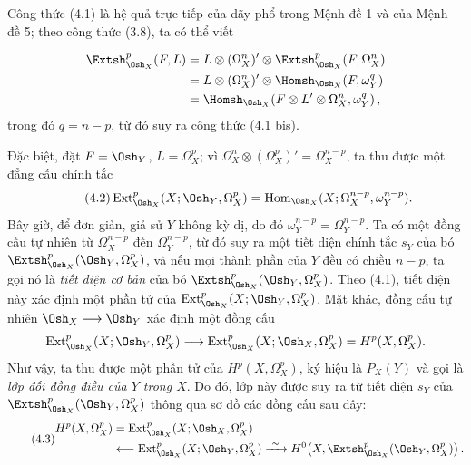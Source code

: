Công thức (4.1) là hệ quả trực tiếp của dãy phổ trong
Mệnh đề 1 và của Mệnh đề 5; theo công thức (3.8), ta có thể
viết


\begin{align*}
\Extsh_{\Osh_X}^{p}(F,L)
&=L\otimes(\Omega_X^{n})'\otimes
  \Extsh_{\Osh_X}^{p}(F,\Omega_X^{n})\\
&=L\otimes(\Omega_X^{n})'\otimes
  \Homsh_{\Osh_X}(F,\omega_Y^{q})\\
&=\Homsh_{\Osh_X}\!\left(
  F\otimes L'\otimes\Omega_X^{n},\omega_Y^{q}\right),
\end{align*}
trong đó $q=n-p$, từ đó suy ra công thức (4.1 bis).

Đặc biệt, đặt $F=\Osh_Y$, $L=\Omega_X^{p}$; vì
$\Omega_X^{n}\otimes(\Omega_X^{p})'=\Omega_X^{n-p}$, ta thu được một đẳng cấu
chính tắc
\begin{equation}\tag{4.2}
  \operatorname{Ext}_{\Osh_X}^{p}(X;\Osh_Y,\Omega_X^{p})
  =\operatorname{Hom}_{\Osh_X}
  (X;\Omega_X^{n-p},\omega_Y^{n-p}).
\end{equation}
Bây giờ, để đơn giản, giả sử $Y$ không kỳ dị, do đó
$\omega_Y^{n-p}=\Omega_Y^{n-p}$. Ta có một đồng cấu tự nhiên từ
$\Omega_X^{n-p}$ đến $\Omega_Y^{n-p}$, từ đó suy ra một tiết diện chính tắc $s_Y$ của
bó $\Extsh_{\Osh_X}^{p}(\Osh_Y,\Omega_X^{p})$, và nếu
mọi thành phần của $Y$ đều có chiều $n-p$, ta gọi nó là \emph{tiết diện
cơ bản} của bó $\Extsh_{\Osh_X}^{p}(\Osh_Y,\Omega_X^{p})$. Theo (4.1), tiết diện
này xác định một phần tử của
$\operatorname{Ext}_{\Osh_X}^{p}(X;\Osh_Y,\Omega_X^{p})$. Mặt khác, đồng cấu
tự nhiên $\Osh_X\longrightarrow\Osh_Y$ xác định một đồng cấu
\[
  \operatorname{Ext}_{\Osh_X}^{p}(X;\Osh_Y,\Omega_X^{p})
  \longrightarrow
  \operatorname{Ext}_{\Osh_X}^{p}(X;\Osh_X,\Omega_X^{p})
  =H^{p}(X,\Omega_X^{p}).
\]
Như vậy, ta thu được một phần tử của $H^{p}(X,\Omega_X^{p})$, ký hiệu là $P_X(Y)$ và gọi là
\emph{lớp đối đồng điều của $Y$ trong $X$}. Do đó, lớp này được suy ra từ tiết diện
$s_Y$ của $\Extsh_{\Osh_X}^{p}(\Osh_Y,\Omega_X^{p})$ thông qua sơ đồ
các đồng cấu sau đây:
\begin{equation}\tag{4.3}
\begin{aligned}
H^{p}(X,\Omega_X^{p})
&=\operatorname{Ext}_{\Osh_X}^{p}(X;\Osh_X,\Omega_X^{p})\\
&\longleftarrow\operatorname{Ext}_{\Osh_X}^{p}(X;\Osh_Y,\Omega_X^{p})
\xrightarrow{\ \sim\ }
H^{0}\!\left(X,\Extsh_{\Osh_X}^{p}(\Osh_Y,\Omega_X^{p})\right).
\end{aligned}
\end{equation}

